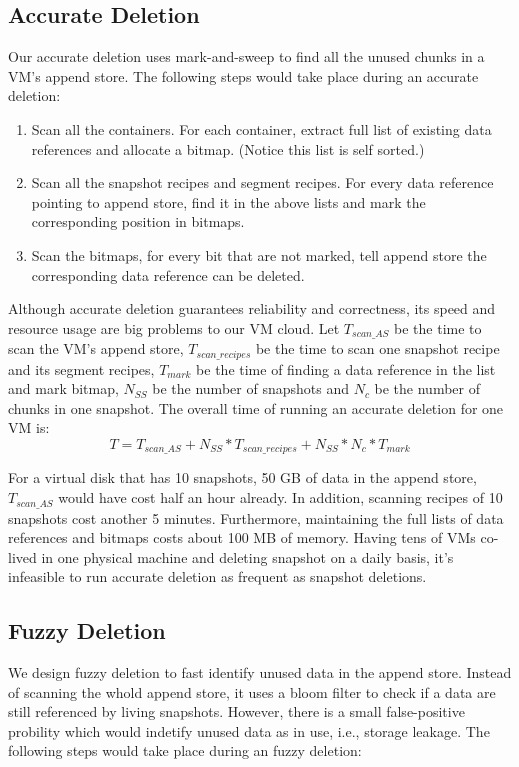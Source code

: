 \subsection{Accurate Deletion}
Our accurate deletion uses mark-and-sweep to find all the unused chunks in a VM's append store.
The following steps would take place during an accurate deletion:

\begin{enumerate}
\item Scan all the containers. For each container, extract full list of existing data references and allocate a bitmap. 
(Notice this list is self sorted.)
\item Scan all the snapshot recipes and segment recipes. For every data reference pointing to append store,
find it in the above lists and mark the corresponding position in bitmaps.
\item Scan the bitmaps, for every bit that are not marked, tell append store the corresponding data reference can be deleted.
\end{enumerate}

Although accurate deletion guarantees reliability and correctness, its speed and resource usage are big problems to our VM cloud.
Let $T_{scan\_AS}$ be the time to scan the VM's append store, $T_{scan\_recipes}$ be the time to scan one snapshot recipe
and its segment recipes, $T_{mark}$ be the time of finding a data reference in the list and mark bitmap, 
$N_{SS}$ be the number of snapshots and $N_c$ be the number of chunks in one snapshot.
The overall time of running an accurate deletion for one VM is:
\begin{equation}
T = T_{scan\_AS} + N_{SS} * T_{scan\_recipes} + N_{SS} * N_c * T_{mark}
\end{equation}

For a virtual disk that has 10 snapshots, 50 GB of data in the append store, $T_{scan\_AS}$ would have cost half an hour already.
In addition, scanning recipes of 10 snapshots cost another 5 minutes.
Furthermore, maintaining the full lists of data references and bitmaps costs about 100 MB of memory. Having tens of VMs
co-lived in one physical machine and deleting snapshot on a daily basis, 
it's infeasible to run accurate deletion as frequent as snapshot deletions.

\subsection{Fuzzy Deletion}
We design fuzzy deletion to fast identify unused data in the append store.
Instead of scanning the whold append store, it uses a bloom filter to check 
if a data are still referenced by living snapshots. However, there is a small false-positive probility which
would indetify unused data as in use, i.e., storage leakage.
The following steps would take place during an fuzzy deletion:

